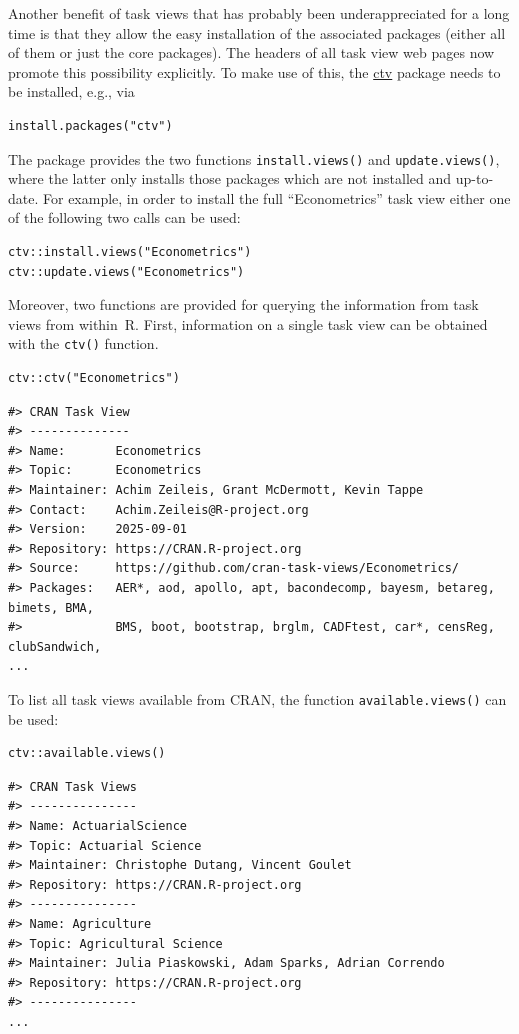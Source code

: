 Another benefit of task views that has probably been underappreciated for a long time is
that they allow the easy installation of the associated packages (either all of them or
just the core packages). The headers of all task view web pages now promote this
possibility explicitly. To make use of this, the \href{https://CRAN.R-project.org/package=ctv}{ctv}
package needs to be installed, e.g., via

\begin{verbatim}
install.packages("ctv")
\end{verbatim}

The package provides the two functions \texttt{install.views()} and \texttt{update.views()},
where the latter only installs those packages which are not installed and up-to-date.
For example, in order to install the full ``Econometrics'' task view either one of the
following two calls can be used:

\begin{verbatim}
ctv::install.views("Econometrics")
ctv::update.views("Econometrics")
\end{verbatim}

Moreover, two functions are provided for querying the information from task views
from within~R. First, information on a single task view can be obtained with the
\texttt{ctv()} function.

\begin{verbatim}
ctv::ctv("Econometrics")
\end{verbatim}

\begin{verbatim}
#> CRAN Task View
#> --------------
#> Name:       Econometrics
#> Topic:      Econometrics
#> Maintainer: Achim Zeileis, Grant McDermott, Kevin Tappe
#> Contact:    Achim.Zeileis@R-project.org
#> Version:    2025-09-01
#> Repository: https://CRAN.R-project.org
#> Source:     https://github.com/cran-task-views/Econometrics/
#> Packages:   AER*, aod, apollo, apt, bacondecomp, bayesm, betareg, bimets, BMA,
#>             BMS, boot, bootstrap, brglm, CADFtest, car*, censReg, clubSandwich,
...
\end{verbatim}

To list all task views available from CRAN, the function \texttt{available.views()} can
be used:

\begin{verbatim}
ctv::available.views()
\end{verbatim}

\begin{verbatim}
#> CRAN Task Views
#> ---------------
#> Name: ActuarialScience
#> Topic: Actuarial Science
#> Maintainer: Christophe Dutang, Vincent Goulet
#> Repository: https://CRAN.R-project.org
#> ---------------
#> Name: Agriculture
#> Topic: Agricultural Science
#> Maintainer: Julia Piaskowski, Adam Sparks, Adrian Correndo 
#> Repository: https://CRAN.R-project.org
#> ---------------
...
\end{verbatim}

